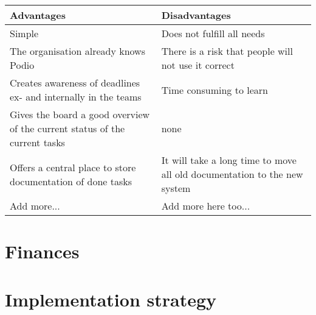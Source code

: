 \begin{center}
    \begin{tabular}{ | p{7cm} | p{7cm} |}
    \hline
    \textbf{Advantages} & \textbf{Disadvantages}  \\ \hline
    Simple & Does not fulfill all needs  \\ \hline
    The organisation already knows Podio & There is a risk that people will not use it correct \\
    \hline
    Creates awareness of deadlines ex- and internally in the teams & Time consuming to learn \\ \hline
    Gives the board a good overview of the current status of the current tasks & none \\ \hline
    Offers a central place to store documentation of done tasks & It will take a long time to move
    all old documentation to the new system \\ \hline
    Add more... & Add more here too... \\ 
    \hline
    \end{tabular}
\end{center}


\section{Finances}

\section{Implementation strategy}


